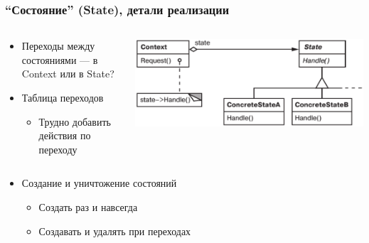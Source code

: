 \documentclass[xetex,mathserif,serif]{beamer}
\begin{document}
	\begin{frame}
		\frametitle{``Состояние'' (State), детали реализации}
		\begin{columns}
			\begin{column}{0.5\textwidth}
				\begin{itemize}
					\item Переходы между состояниями --- в Context или в State?
					\item Таблица переходов
					\begin{itemize}
						\item Трудно добавить действия по переходу
					\end{itemize}
				\end{itemize}
			\end{column}
			\begin{column}{0.5\textwidth}
				\begin{center}
					\includegraphics[width=\textwidth]{state.png}
				\end{center}
			\end{column}
		\end{columns}
		\begin{itemize}
			\item Создание и уничтожение состояний
			\begin{itemize}
				\item Создать раз и навсегда
				\item Создавать и удалять при переходах
			\end{itemize}
		\end{itemize}
	\end{frame}
\end{document}
